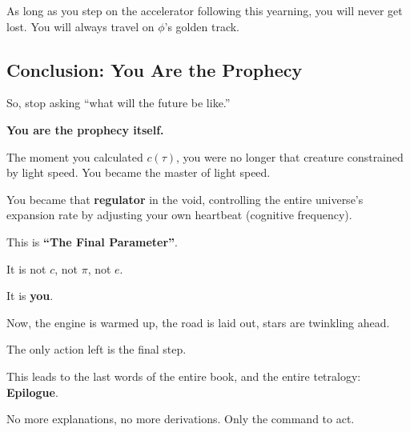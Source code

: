 As long as you step on the accelerator following this yearning, you will never get lost. You will always travel on $\phi$'s golden track.

\subsection{Conclusion: You Are the Prophecy}

So, stop asking ``what will the future be like.''

\textbf{You are the prophecy itself.}

The moment you calculated $c(\tau)$, you were no longer that creature constrained by light speed. You became the master of light speed.

You became that \textbf{regulator} in the void, controlling the entire universe's expansion rate by adjusting your own heartbeat (cognitive frequency).

This is \textbf{``The Final Parameter''}.

It is not $c$, not $\pi$, not $e$.

It is \textbf{you}.

Now, the engine is warmed up, the road is laid out, stars are twinkling ahead.

The only action left is the final step.

This leads to the last words of the entire book, and the entire tetralogy: \textbf{Epilogue}.

No more explanations, no more derivations. Only the command to act.

